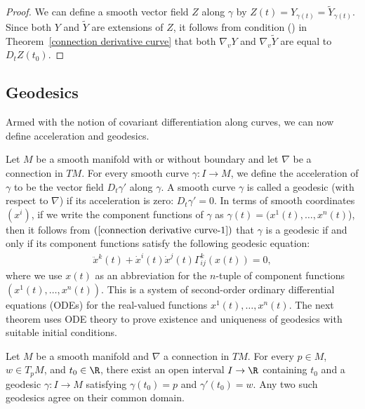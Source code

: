 \begin{proof}
We can define a smooth vector field $Z$ along $\gamma$ by $Z(t)=Y_{\gamma(t)}=\widetilde{Y}_{\gamma(t)}$. 
Since both $Y$ and $\widetilde{Y}$ are extensions of $Z$, it follows from condition () 
in Theorem~\ref{connection derivative curve} that both $\nabla_vY$ and $\nabla_v\widetilde{Y}$ 
are equal to $D_tZ(t_0)$.
\end{proof}
\subsection{Geodesics}
Armed with the notion of covariant differentiation along curves, we can now define acceleration 
and geodesics.\par
Let $M$ be a smooth manifold with or without boundary and let $\nabla$ be a connection in $TM$. For every 
smooth curve $\gamma:I\to M$, we define the acceleration of $\gamma$ to be the vector field $D_t\gamma'$ along $\gamma$. 
A smooth curve $\gamma$ is called a geodesic (with respect to $\nabla$) if its acceleration is zero: $D_t\gamma'=0$. 
In terms of smooth coordinates $(x^i)$, if we write the component functions of $\gamma$ as $\gamma(t)=(x^1(t),\dots,x^n(t)$), 
then it follows from $(\ref{connection derivative curve-1})$ that $\gamma$ is a geodesic if and only if its component 
functions satisfy the following geodesic equation:
\begin{align}\label{connection geodesic equation}
\ddot{x}^k(t)+\dot{x}^i(t)\dot{x}^j(t)\Gamma_{ij}^k(x(t))=0,
\end{align}
where we use $x(t)$ as an abbreviation for the $n$-tuple of component functions $(x^1(t),\dots,x^n(t))$. This is a system of second-order ordinary differential equations (ODEs) for the real-valued functions $x^1(t),\dots,x^n(t)$. The next theorem uses ODE theory to prove existence and uniqueness of geodesics with suitable initial conditions.
\begin{theorem}\label{geodesic existence unique}
Let $M$ be a smooth manifold and $\nabla$ a connection in $TM$. For every $p\in M$, $w\in T_pM$, and $t_0\in\R$, there exist 
an open interval $I\to\R$ containing $t_0$ and a geodesic $\gamma:I\to M$ satisfying $\gamma(t_0)=p$ and $\gamma'(t_0)=w$. Any 
two such geodesics agree on their common domain.
\end{theorem}

